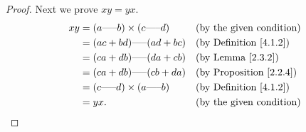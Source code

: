 \begin{proof}
    Next we prove \(xy = yx\).
    \begin{align*}
        xy & = (a \text{-----} b) \times (c \text{-----} d) &  & \text{(by the given condition)}     \\
           & = (ac + bd) \text{-----} (ad + bc)             &  & \text{(by Definition \ref{4.1.2})}  \\
           & = (ca + db) \text{-----} (da + cb)             &  & \text{(by Lemma \ref{2.3.2})}       \\
           & = (ca + db) \text{-----} (cb + da)             &  & \text{(by Proposition \ref{2.2.4})} \\
           & = (c \text{-----} d) \times (a \text{-----} b) &  & \text{(by Definition \ref{4.1.2})}  \\
           & = yx.                                          &  & \text{(by the given condition)}
    \end{align*}


\end{proof}
